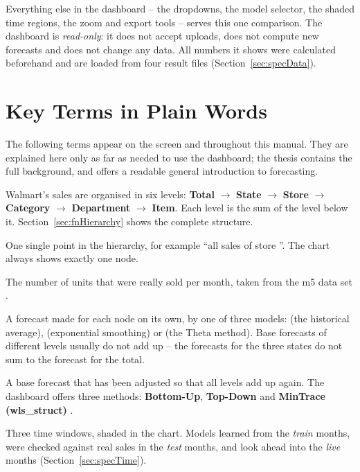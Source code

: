 Everything else in the dashboard -- the dropdowns, the model selector, the shaded time regions, the zoom and export tools -- serves this one comparison. The dashboard is \emph{read-only}: it does not accept uploads, does not compute new forecasts and does not change any data. All numbers it shows were calculated beforehand and are loaded from four result files (Section~\ref{sec:specData}).

\section{Key Terms in Plain Words}
\label{sec:keyTerms}

The following terms appear on the screen and throughout this manual. They are explained here only as far as needed to use the dashboard; the thesis contains the full background, and \cite{Hyndman:2021} offers a readable general introduction to forecasting.

\begin{description}[style=nextline,leftmargin=0.5cm,font=\normalfont\bfseries]
  \item[Hierarchy] Walmart's sales are organised in six levels: \textbf{Total} $\rightarrow$ \textbf{State} $\rightarrow$ \textbf{Store} $\rightarrow$ \textbf{Category} $\rightarrow$ \textbf{Department} $\rightarrow$ \textbf{Item}. Each level is the sum of the level below it. Section~\ref{sec:fnHierarchy} shows the complete structure.
  \item[Node] One single point in the hierarchy, for example ``all sales of store ''. The chart always shows exactly one node.
  \item[Actual sales] The number of units that were really sold per month, taken from the \ac{m5} data set \cite{Makridakis:2022,Kaggle:M5}.
  \item[Base forecast] A forecast made for each node on its own, by one of three models:  (the historical average),  (exponential smoothing) or  (the Theta method). Base forecasts of different levels usually do not add up -- the forecasts for the three states do not sum to the forecast for the total.
  \item[Reconciled forecast] A base forecast that has been adjusted so that all levels add up again. The dashboard offers three methods: \textbf{Bottom-Up}, \textbf{Top-Down} and \textbf{MinTrace (wls\_struct)} \cite{Wickramasuriya:2019}.
  \item[Train / Test / Live] Three time windows, shaded in the chart. Models learned from the \emph{train} months, were checked against real sales in the \emph{test} months, and look ahead into the \emph{live} months (Section~\ref{sec:specTime}).
\end{description}

